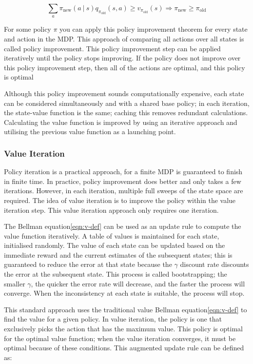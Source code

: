 \documentclass[]{final_report}
\begin{document}
\begin{equation}
  \sum_a \pi_{\text{new}}(a\ |\ s) q_{\pi_{\text{old}}}(s,a) \ge v_{\pi_{\text{old}}}(s) \Rightarrow  \pi_{\text{new}} \ge \pi_{\text{old}}
  \label{eqn:policy-improvement-theorem}
\end{equation}

For some policy $\pi$ you can apply this policy improvement theorem for every state and action in the MDP. This approach of comparing all actions over all states is called policy improvement. This policy improvement step can be applied iteratively until the policy stops improving. If the policy does not improve over this policy improvement step, then all of the actions are optimal, and this policy is optimal

Although this policy improvement sounds computationally expensive, each state can be considered simultaneously and with a shared base policy; in each iteration, the state-value function is the same; caching this removes redundant calculations. Calculating the value function is improved by using an iterative approach and utilising the previous value function as a launching point.  


\subsubsection{Value Iteration}

Policy iteration is a practical approach, for a finite MDP is guaranteed to finish in finite time. In practice, policy improvement does better and only takes a few iterations. However, in each iteration, multiple full sweeps of the state space are required. The idea of value iteration is to improve the policy within the value iteration step. This value iteration approach only requires one iteration. 

The Bellman equation\ref{eqn:v-def} can be used as an update rule to compute the value function iteratively. A table of values is maintained for each state, initialised randomly. The value of each state can be updated based on the immediate reward and the current estimates of the subsequent states; this is guaranteed to reduce the error at that state because the $\gamma$ discount rate discounts the error at the subsequent state. This process is called bootstrapping; the smaller $\gamma$, the quicker the error rate will decrease, and the faster the process will converge. When the inconsistency at each state is suitable, the process will stop. 

This standard approach uses the traditional value Bellman equation\ref{eqn:v-def} to find the value for a given policy. In value iteration, the policy is one that exclusively picks the action that has the maximum value. This policy is optimal for the optimal value function; when the value iteration converges, it must be optimal because of these conditions. This augmented update rule can be defined as:
\end{document}
